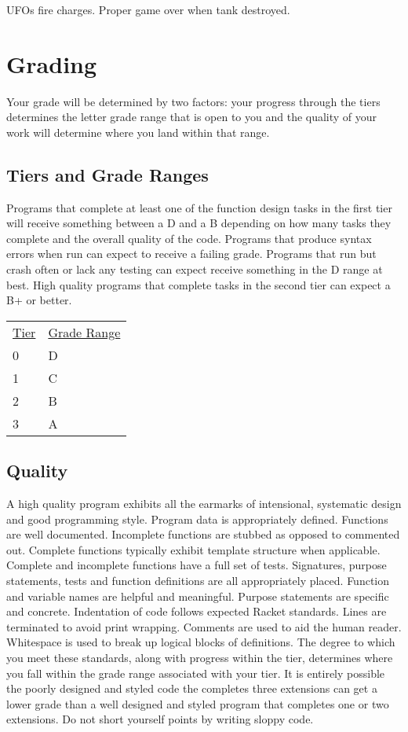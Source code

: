 \documentclass[nobib]{tufte-handout}
\begin{document}
UFOs fire charges. Proper game over when tank destroyed.


\section*{Grading}

Your grade will be determined by two factors: your progress through the tiers determines the letter grade range that is open to you and the quality of your work will determine where you land within that range.

\subsection*{Tiers and Grade Ranges}

Programs that complete at least one of the function design tasks in the first tier will receive something between a D and a B depending on how many tasks they complete and the overall quality of the code. Programs that produce syntax errors when run can expect to receive a failing grade. Programs that run but crash often or lack any testing can expect receive something in the D range at best. High quality programs that complete tasks in the second tier can expect a B+ or better.

\begin{tabular}{ll}
\underline{Tier} & \underline{Grade Range} \\
 0 & D \\
 1 & C \\
 2 & B \\
 3 & A \\
\end{tabular}


\subsection*{Quality}

A high quality program exhibits all the earmarks of intensional, systematic design and good programming style. Program data is appropriately defined. Functions are well documented. Incomplete functions are stubbed as opposed to commented out. Complete functions typically exhibit template structure when applicable. Complete and incomplete functions have a full set of tests. Signatures, purpose statements, tests and function definitions are all appropriately placed.  Function and variable names are helpful and meaningful. Purpose statements are specific and concrete. Indentation of code follows expected Racket standards. Lines are terminated to avoid print wrapping. Comments are used to aid the human reader. Whitespace is used to break up logical blocks of definitions. The degree to which you meet these standards, along with progress within the tier, determines where you fall within the grade range associated with your tier. It is entirely possible the poorly designed and styled code the completes three extensions can get a lower grade than a well designed and styled program that completes one or two extensions. Do not short yourself points by writing sloppy code.
\end{document}
